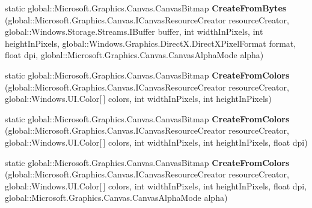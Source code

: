 \begin{DoxyCompactItemize}
\item 
\mbox{\label{class_microsoft_1_1_graphics_1_1_canvas_1_1_canvas_bitmap_a86cbc0abd68451ea818e39d8079e60c9}} 
static global\+::\+Microsoft.\+Graphics.\+Canvas.\+Canvas\+Bitmap {\bfseries Create\+From\+Bytes} (global\+::\+Microsoft.\+Graphics.\+Canvas.\+I\+Canvas\+Resource\+Creator resource\+Creator, global\+::\+Windows.\+Storage.\+Streams.\+I\+Buffer buffer, int width\+In\+Pixels, int height\+In\+Pixels, global\+::\+Windows.\+Graphics.\+Direct\+X.\+Direct\+X\+Pixel\+Format format, float dpi, global\+::\+Microsoft.\+Graphics.\+Canvas.\+Canvas\+Alpha\+Mode alpha)
\item 
\mbox{\label{class_microsoft_1_1_graphics_1_1_canvas_1_1_canvas_bitmap_aa56711d36aa2bc46baefdbf6ca694427}} 
static global\+::\+Microsoft.\+Graphics.\+Canvas.\+Canvas\+Bitmap {\bfseries Create\+From\+Colors} (global\+::\+Microsoft.\+Graphics.\+Canvas.\+I\+Canvas\+Resource\+Creator resource\+Creator, global\+::\+Windows.\+U\+I.\+Color\mbox{[}$\,$\mbox{]} colors, int width\+In\+Pixels, int height\+In\+Pixels)
\item 
\mbox{\label{class_microsoft_1_1_graphics_1_1_canvas_1_1_canvas_bitmap_a488d3b7c9e0730ddce84772fc314dedc}} 
static global\+::\+Microsoft.\+Graphics.\+Canvas.\+Canvas\+Bitmap {\bfseries Create\+From\+Colors} (global\+::\+Microsoft.\+Graphics.\+Canvas.\+I\+Canvas\+Resource\+Creator resource\+Creator, global\+::\+Windows.\+U\+I.\+Color\mbox{[}$\,$\mbox{]} colors, int width\+In\+Pixels, int height\+In\+Pixels, float dpi)
\item 
\mbox{\label{class_microsoft_1_1_graphics_1_1_canvas_1_1_canvas_bitmap_a00bad59ca00bf7edd9ce60d8a4aded82}} 
static global\+::\+Microsoft.\+Graphics.\+Canvas.\+Canvas\+Bitmap {\bfseries Create\+From\+Colors} (global\+::\+Microsoft.\+Graphics.\+Canvas.\+I\+Canvas\+Resource\+Creator resource\+Creator, global\+::\+Windows.\+U\+I.\+Color\mbox{[}$\,$\mbox{]} colors, int width\+In\+Pixels, int height\+In\+Pixels, float dpi, global\+::\+Microsoft.\+Graphics.\+Canvas.\+Canvas\+Alpha\+Mode alpha)
\item 
\mbox{\label{class_microsoft_1_1_graphics_1_1_canvas_1_1_canvas_bitmap_afcc3780c1206b46f43b6c56426ce3240}} 

\end{DoxyCompactItemize}
